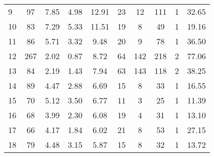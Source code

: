 \begin{tabular}{lccccccccc}
 9 &       97 &                             7.85 &                             4.98 &                            12.91 &              23 &              12 &                       111 &          1 &                        32.65 \\
10 &       83 &                             7.29 &                             5.33 &                            11.51 &              19 &               8 &                        49 &          1 &                        19.16 \\
11 &       86 &                             5.71 &                             3.32 &                             9.48 &              20 &               9 &                        78 &          1 &                        36.50 \\
12 &      267 &                             2.02 &                             0.87 &                             8.72 &              64 &             142 &                       218 &          2 &                        77.06 \\
13 &       84 &                             2.19 &                             1.43 &                             7.94 &              63 &             143 &                       118 &          2 &                        38.25 \\
14 &       89 &                             4.47 &                             2.88 &                             6.69 &              15 &               8 &                        33 &          1 &                        16.55 \\
15 &       70 &                             5.12 &                             3.50 &                             6.77 &              11 &               3 &                        25 &          1 &                        11.39 \\
16 &       68 &                             3.99 &                             2.30 &                             6.08 &              19 &               4 &                        31 &          1 &                        13.10 \\
17 &       66 &                             4.17 &                             1.84 &                             6.02 &              21 &               8 &                        53 &          1 &                        27.15 \\
18 &       79 &                             4.48 &                             3.15 &                             5.87 &              15 &               8 &                        32 &          1 &                        13.72 \\

\end{tabular}
